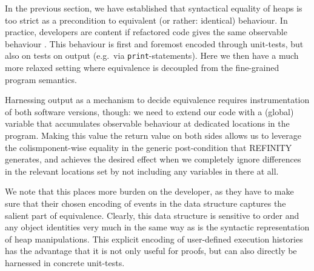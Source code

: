 In the previous section, we have established that syntactical equality of heaps is too strict as a precondition to equivalent (or rather: identical) behaviour.
In practice, developers are content if refactored code gives the same observable behaviour \cite{needed}.
This behaviour is first and foremost encoded through unit-tests, but also on tests on output (e.g.\ via \texttt{print}-statements).
Here we then have a much more relaxed setting where equivalence is decoupled from the fine-grained program semantics.

Harnessing output as a mechanism to decide equivalence requires instrumentation of both software versions, though:
we need to extend our code with a (global) variable that accumulates observable behaviour at dedicated locations in the program.
Making this value the return value on both sides allows us to leverage the colismponent-wise equality in the generic post-condition that REFINITY generates,
and achieves the desired effect when we completely ignore differences in the relevant locations set by not including any variables in there at all.

We note that this places more burden on the developer, as they have to make sure that their chosen encoding of events in the data structure captures the salient part of equivalence.
Clearly, this data structure is sensitive to order and any object identities very much in the same way as is the syntactic representation of heap manipulations.
This explicit encoding of user-defined execution histories has the advantage that it is not only useful for proofs, but can also directly be harnessed in concrete unit-tests.



